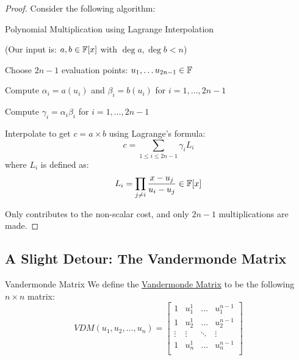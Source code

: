 \begin{proof}
Consider the following algorithm:

\begin{algorithm}[H]
    \caption{Polynomial Multiplication using Lagrange Interpolation}\label{alg:poly-mult-lagrange}

    (Our input is: $a,b \in \operatorname{\mathbb{F}}[x]$ with $\deg a, \deg b < n$)

    \BlankLine
    \nl Choose $2n - 1$ evaluation points: $u_1, \ldots u_{2n - 1} \in \operatorname{\mathbb{F}}$

    \nl Compute $\alpha_i = a(u_i)$ and $\beta_i = b(u_i)$ for $i = 1,\ldots, 2n - 1$

    \nl \label{step:non-scalar-mults} Compute $\gamma_i = \alpha_i\beta_i$ for $i = 1,\ldots, 2n - 1$ 

    \nl Interpolate to get $c = a \times b$ using Lagrange's formula:
    \begin{equation}
        c = \sum_{1 \leq i \leq 2n-1} \gamma_i L_i
    \end{equation}
    where $L_i$ is defined as:
    \begin{equation}
        L_i = \prod_{j \neq i} \frac{x - u_j}{u_i - u_j} \in \operatorname{\mathbb{F}}[x]
    \end{equation}
\end{algorithm}
Only  contributes to the non-scalar cost, and only $2n - 1$ multiplications are made.
\end{proof}

\subsection{A Slight Detour: The Vandermonde Matrix}
\begin{definition}{Vandermonde Matrix}{}
    We define the \underline{Vandermonde Matrix} to be the following $n \times n$ matrix:
    \begin{equation}
        VDM(u_1, u_2, \ldots, u_n) = 
        \begin{bmatrix}
            1 & u_1^1 & \ldots & u_1^{n-1} \\
            1 & u_2^1 & \ldots & u_2^{n-1} \\
            \vdots & \vdots & \ddots & \vdots \\
            1 & u_n^1 & \ldots & u_n^{n-1} \\
        \end{bmatrix}
    \end{equation}
\end{definition}

